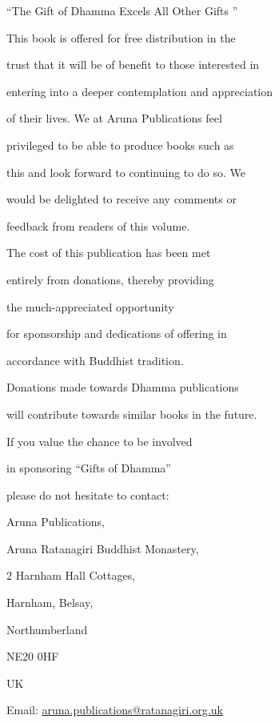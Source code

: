 \documentclass[a4paper,portrait,12pt]{article}
\begin{document}
``The Gift of Dhamma Excels All Other Gifts ''





This book is offered for free distribution in the


trust that it will be of benefit to those interested in


entering into a deeper contemplation and appreciation


of their lives. We at Aruna Publications feel


privileged to be able to produce books such as


this and look forward to continuing to do so. We


would be delighted to receive any comments or


feedback from readers of this volume.





The cost of this publication has been met


entirely from donations, thereby providing 


the much-appreciated opportunity


for sponsorship and dedications of offering in


accordance with Buddhist tradition. 


Donations made towards Dhamma publications 


will contribute towards similar books in the future. 


If you value the chance to be involved 


in sponsoring ``Gifts of Dhamma''


please do not hesitate to contact:





Aruna Publications,


Aruna Ratanagiri Buddhist Monastery,


2 Harnham Hall Cottages,


Harnham, Belsay,


Northumberland


NE20 0HF


UK





Email: \href{mailto:aruna.publications@ratanagiri.org.uk}{aruna.publications@ratanagiri.org.uk}
\end{document}
